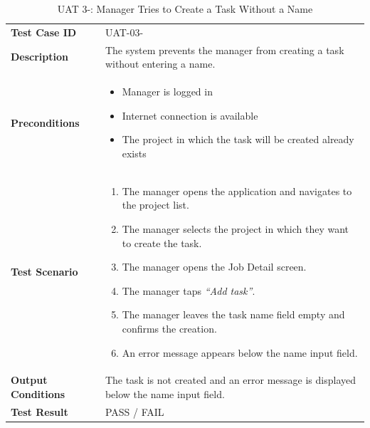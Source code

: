 \documentclass[12pt,a4paper]{article}
\begin{document}
\begin{table}[h]
\centering
\caption{UAT 3-: Manager Tries to Create a Task Without a Name}
\begin{tabularx}{\textwidth}{>{\bfseries}l X}
\toprule
Test Case ID & UAT-03- \\
Description & The system prevents the manager from creating a task without entering a name. \\
Preconditions &
\begin{itemize}[noitemsep]
    \item Manager is logged in
    \item Internet connection is available
    \item The project in which the task will be created already exists
\end{itemize} \\
Test Scenario &
\begin{enumerate}[noitemsep]
    \item The manager opens the application and navigates to the project list.
    \item The manager selects the project in which they want to create the task.
    \item The manager opens the Job Detail screen.
    \item The manager taps \emph{``Add task''}.
    \item The manager leaves the task name field empty and confirms the creation.
    \item An error message appears below the name input field.
\end{enumerate} \\
Output Conditions & The task is not created and an error message is displayed below the name input field. \\
Test Result & PASS / FAIL \\
\bottomrule
\end{tabularx}
\end{table}
\end{document}
